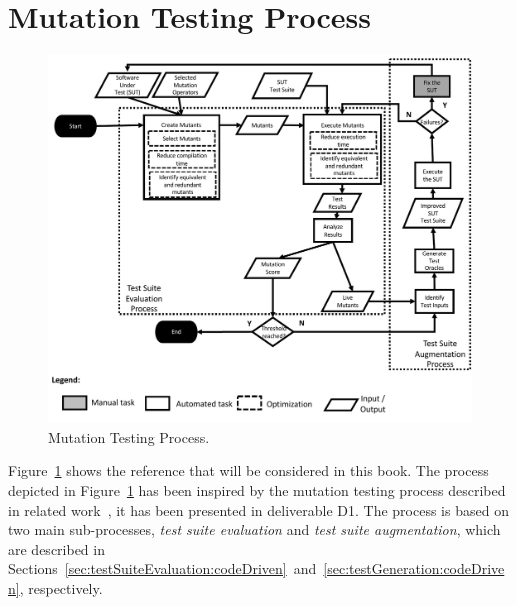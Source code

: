 
\section{Mutation Testing Process}
\label{sec:process}

	\begin{figure}
	\centering
		\includegraphics[width=\textwidth]{images/process}
		\caption{Mutation Testing Process.}
		\label{fig:code:process}
	\end{figure}

Figure~\ref{fig:code:process} shows the reference  that will be considered in this book. The process depicted in Figure~\ref{fig:code:process} has been inspired by the mutation testing process described in related work~\cite{offutt2001mutation,papadakis2019mutation}, it has been presented in deliverable D1. The process is based on two main sub-processes, \emph{test suite evaluation} and \emph{test suite augmentation}, which are described in Sections~\ref{sec:testSuiteEvaluation:codeDriven}~and~\ref{sec:testGeneration:codeDriven}, respectively.


\endinput




